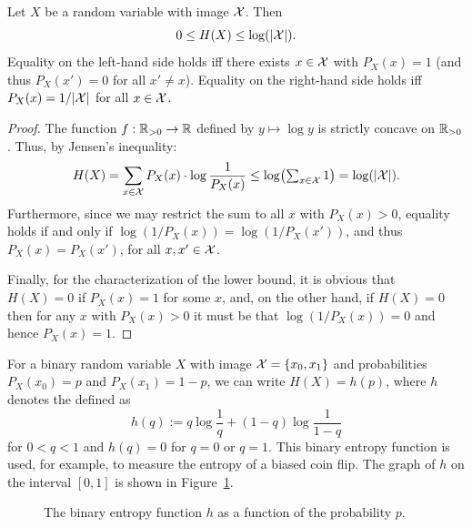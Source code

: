 \begin{proposition}[Positivity]\label{prop:positivity}
Let $X$ be a random variable with image ${\cal X}$. Then
\[
0\leq H(X) \leq \log(|{\cal X}|).
\]
Equality on the left-hand side holds iff there exists $x\in {\cal
X}$ with $P_X(x)=1$ (and thus $P_X(x')=0$ for all $x' \neq x$). Equality on the right-hand side holds iff
$P_X(x)=1/|{\cal X}|$ for all $x\in {\cal X}$.
\end{proposition}

\begin{proof}
The function $f:
\mathbb{R}_{>0} \to \mathbb{R}$ defined by $y\mapsto \log y$ is strictly
 concave on $\mathbb{R}_{>0}$. Thus, by Jensen's inequality: 
\[
H(X)=\sum_{x\in {\cal X}} P_X(x) \cdot \log \frac{1}{P_X(x)}\leq
\log\bigl(\textstyle\sum_{x\in {\cal X}} 1\bigr)=\log(|{\cal X}|).
\]
Furthermore, since we may restrict the sum to all $x$ with $P_X(x)>0$, equality holds if and only if  $\log(1/P_X(x)) = \log(1/P_X(x'))$, and thus $P_X(x) = P_X(x')$, for all $x,x' \in \cal X$. 

Finally, for the characterization of the lower bound, it is obvious that $H(X) = 0$ if $P_X(x) = 1$ for some $x$, and, on the other hand, if $H(X) = 0$ then for any $x$ with $P_X(x) > 0$ it must be that $\log(1/P_X(x)) = 0$ and hence $P_X(x) = 1$. 
\end{proof}

For a binary random variable $X$ with image ${\cal X} = \{x_0,x_1\}$ and probabilities $P_X(x_0) = p$ and $P_X(x_1) = 1-p$, we can write $H(X) = h(p)$, where $h$ denotes the  defined as 
\[
h(q) := q \log\frac{1}{q} + (1-q)\log\frac{1}{1-q}
\]
for $0 < q < 1$ and $h(q) = 0$ for $q=0$ or $q=1$. This binary entropy function is used, for example, to measure the entropy of a biased coin flip. The graph of $h$ on the interval $[0,1]$ is shown in Figure~\ref{fig:bin-entropy}.
\begin{figure}[h]
\centering{}
\caption{The binary entropy function $h$ as a function of the probability $p$.}\label{fig:bin-entropy}
\end{figure}

